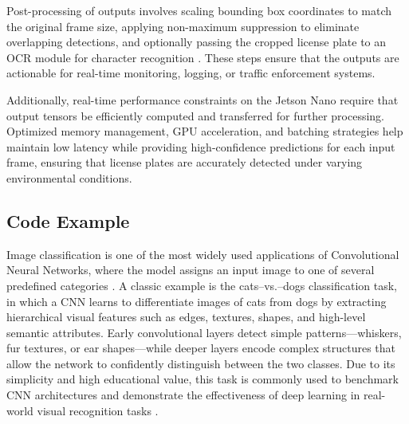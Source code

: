 Post-processing of outputs involves scaling bounding box coordinates to match the original frame size, applying non-maximum suppression to eliminate overlapping detections, and optionally passing the cropped license plate to an OCR module for character recognition \cite{pinto2022springer}. These steps ensure that the outputs are actionable for real-time monitoring, logging, or traffic enforcement systems.

Additionally, real-time performance constraints on the Jetson Nano require that output tensors be efficiently computed and transferred for further processing. Optimized memory management, GPU acceleration, and batching strategies help maintain low latency while providing high-confidence predictions for each input frame, ensuring that license plates are accurately detected under varying environmental conditions.


\subsection{Code Example}

Image classification is one of the most widely used applications of Convolutional Neural Networks, where the model assigns an input image to one of several predefined categories \cite{goodfellow2016deep}. A classic example is the cats–vs.–dogs classification task, in which a CNN learns to differentiate images of cats from dogs by extracting hierarchical visual features such as edges, textures, shapes, and high-level semantic attributes. Early convolutional layers detect simple patterns—whiskers, fur textures, or ear shapes—while deeper layers encode complex structures that allow the network to confidently distinguish between the two classes. Due to its simplicity and high educational value, this task is commonly used to benchmark CNN architectures and demonstrate the effectiveness of deep learning in real-world visual recognition tasks \cite{krizhevsky2012imagenet,pinto2022springer}.



